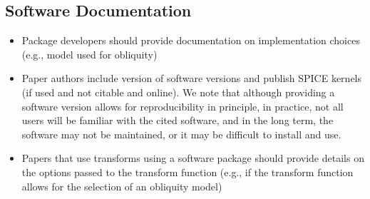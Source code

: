 \documentclass[draft]{agujournal2019}
\begin{document}









\subsection{Software Documentation}

\begin{itemize}

  \item Package developers should provide documentation on implementation choices (e.g., model used for obliquity)
  \item Paper authors include version of software versions and publish SPICE kernels (if used and not citable and online). We note that although providing a software version allows for reproducibility in principle, in practice, not all users will be familiar with the cited software, and in the long term, the software may not be maintained, or it may be difficult to install and use. 
  \item Papers that use transforms using a software package should provide details on the options passed to the transform function (e.g., if the transform function allows for the selection of an obliquity model)

\end{itemize}


\end{document}
